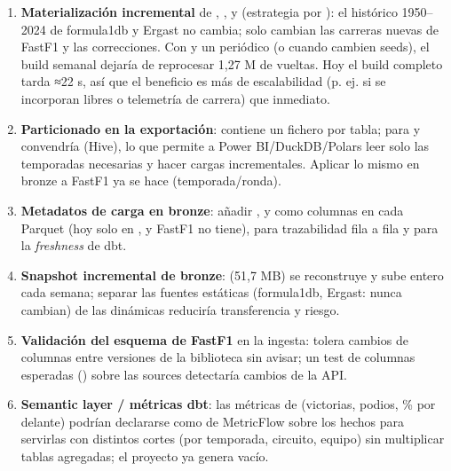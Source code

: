 \begin{enumerate}
\item \textbf{Materialización incremental} de , ,  y  (estrategia  por ): el histórico 1950–2024 de formula1db y Ergast no cambia; solo cambian las carreras nuevas de FastF1 y las correcciones. Con  y un  periódico (o cuando cambien seeds), el build semanal dejaría de reprocesar 1,27 M de vueltas. Hoy el build completo tarda ≈22 s, así que el beneficio es más de escalabilidad (p. ej. si se incorporan libres o telemetría de carrera) que inmediato.
\item \textbf{Particionado en la exportación}:  contiene un fichero por tabla; para  y  convendría  (Hive), lo que permite a Power BI/DuckDB/Polars leer solo las temporadas necesarias y hacer cargas incrementales. Aplicar lo mismo en bronze a FastF1 ya se hace (temporada/ronda).
\item \textbf{Metadatos de carga en bronze}: añadir ,  y  como columnas en cada Parquet (hoy solo en , y FastF1 no tiene), para trazabilidad fila a fila y para la \emph{freshness} de dbt.
\item \textbf{Snapshot incremental de bronze}:  (51,7 MB) se reconstruye y sube entero cada semana; separar las fuentes estáticas (formula1db, Ergast: nunca cambian) de las dinámicas reduciría transferencia y riesgo.
\item \textbf{Validación del esquema de FastF1} en la ingesta:  tolera cambios de columnas entre versiones de la biblioteca sin avisar; un test de columnas esperadas () sobre las sources detectaría cambios de la API.
\item \textbf{Semantic layer / métricas dbt}: las métricas de  (victorias, podios, \% por delante) podrían declararse como  de MetricFlow sobre los hechos para servirlas con distintos cortes (por temporada, circuito, equipo) sin multiplicar tablas agregadas; el proyecto ya genera  vacío.
\end{enumerate}

